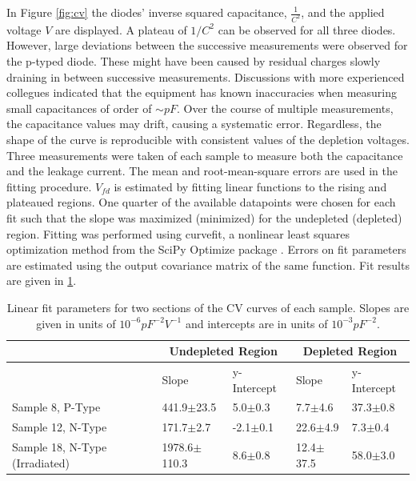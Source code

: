 \documentclass[11pt,a4paper]{report}
\begin{document}
In Figure \ref{fig:cv} the diodes' inverse squared capacitance, $\frac{1}{C^{2}}$, and the applied voltage $V$ are displayed.
A plateau of $1/C^2$ can be observed for all three diodes.
However, large deviations between the successive measurements were observed for the p-typed diode. These might have been caused by residual charges slowly draining in between successive measurements.
Discussions with more experienced collegues indicated that the equipment has known inaccuracies when measuring small capacitances of order of $\sim pF$. Over the course of multiple measurements, the capacitance values may drift, causing a systematic error. Regardless, the shape of the curve is reproducible with consistent values of the depletion voltages.
Three measurements were taken of each sample to measure both the capacitance and the leakage current. The mean and root-mean-square errors are used in the fitting procedure. 
$V_{fd}$ is estimated by fitting linear functions to the rising and plateaued regions. One quarter of the available datapoints were chosen for each fit such that the slope was maximized (minimized) for the undepleted (depleted) region. 
Fitting was performed using curve\textunderscore fit, a nonlinear least squares optimization method from the SciPy Optimize package \cite{scipy_curvefit}. Errors on fit parameters are estimated using the output covariance matrix of the same function. 
Fit results are given in \ref{tab:fits}. 

\begin{table}[h]
\centering
\caption{Linear fit parameters for two sections of the CV curves of each sample. Slopes are given in units of $10^{-6}pF^{-2}V^{-1}$ and intercepts are in units of $10^{-3}pF^{-2}$.}\label{tab:fits}
\begin{tabular}{lllll}
    \toprule
    & \multicolumn{2}{c}{Undepleted Region}   & \multicolumn{2}{c}{Depleted Region}  \\
    \midrule
    & Slope & y-Intercept & Slope & y-Intercept \\
    \midrule
    Sample 8, P-Type                & 441.9$\pm$23.5    & 5.0$\pm$0.3     & 7.7$\pm$4.6     & 37.3$\pm$0.8  \\
    Sample 12, N-Type               & 171.7$\pm$2.7     & -2.1$\pm$0.1    & 22.6$\pm$4.9    & 7.3$\pm$0.4   \\
    Sample 18, N-Type (Irradiated)  & 1978.6$\pm$110.3   & 8.6$\pm$0.8  & 12.4$\pm$37.5   & 58.0$\pm$3.0    \\
    \bottomrule
\end{tabular}
\end{table}
\end{document}
